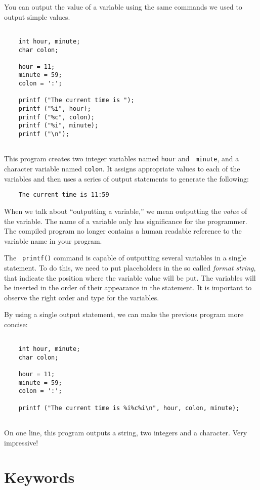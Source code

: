 You can output the value of a variable using the same commands
we used to output simple values.

\begin{verbatim}

    int hour, minute;
    char colon;

    hour = 11;
    minute = 59;
    colon = ':';

    printf ("The current time is ");
    printf ("%i", hour);
    printf ("%c", colon);
    printf ("%i", minute);
    printf ("\n"); 
  
\end{verbatim}
%
This program creates two integer variables named {\tt hour} and {\tt
minute}, and a character variable named {\tt colon}.  It assigns
appropriate values to each of the variables and then uses a series
of output statements to generate the following:

\begin{verbatim}
    The current time is 11:59
\end{verbatim}

When we talk about ``outputting a variable,'' we mean outputting the
{\em value} of the variable.  The name of a variable only has significance for
the programmer. The compiled program no longer contains a human readable
reference to the variable name in your program. 

The \texttt{ printf()} command is capable of outputting several variables
in a single statement. To do this, we need to put placeholders
in the so called \emph{format string}, that indicate the position where the variable value will
be put. The variables will be inserted in the order of their appearance in 
the statement. It is important to observe the right order and type for the variables.

By using a single output statement, we can make the previous program more
concise:

\begin{verbatim}
    
    int hour, minute;
    char colon;

    hour = 11;
    minute = 59;
    colon = ':';

    printf ("The current time is %i%c%i\n", hour, colon, minute);
    
\end{verbatim}
%
On one line, this program outputs a string, two integers and a character.  Very impressive!

\section{Keywords}

